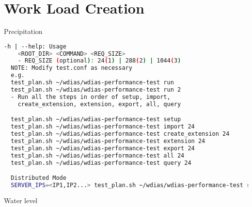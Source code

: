 \section{Work Load Creation}

Precipitation
\begin{lstlisting}[language=sh, caption=Test Plan Help]
-h | --help: Usage
    <ROOT_DIR> <COMMAND> <REQ_SIZE>
    - REQ_SIZE (optional): 24(1) | 288(2) | 1044(3)
  NOTE: Modify test.conf as necessary
  e.g.
  test_plan.sh ~/wdias/wdias-performance-test run
  test_plan.sh ~/wdias/wdias-performance-test run 2
  - Run all the steps in order of setup, import, 
    create_extension, extension, export, all, query

  test_plan.sh ~/wdias/wdias-performance-test setup
  test_plan.sh ~/wdias/wdias-performance-test import 24
  test_plan.sh ~/wdias/wdias-performance-test create_extension 24
  test_plan.sh ~/wdias/wdias-performance-test extension 24
  test_plan.sh ~/wdias/wdias-performance-test export 24
  test_plan.sh ~/wdias/wdias-performance-test all 24
  test_plan.sh ~/wdias/wdias-performance-test query 24

  Distributed Mode
  SERVER_IPS=<IP1,IP2...> test_plan.sh ~/wdias/wdias-performance-test run

\end{lstlisting}

Water level